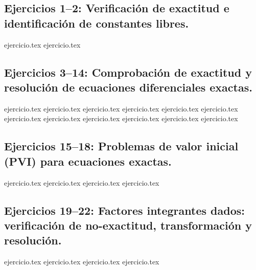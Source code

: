 
\subsection*{Ejercicios 1--2: Verificación de exactitud e identificación de constantes libres.}
\begin{enumerate}
    {ejercicio.tex}
    {ejercicio.tex}
\end{enumerate}

\subsection*{Ejercicios 3--14: Comprobación de exactitud y resolución de ecuaciones diferenciales exactas.}
\begin{enumerate}
    \setcounter{enumi}{2}
    {ejercicio.tex}
    {ejercicio.tex}
    {ejercicio.tex}
    {ejercicio.tex}
    {ejercicio.tex}
    {ejercicio.tex}
    {ejercicio.tex}
    {ejercicio.tex}
    {ejercicio.tex}
    {ejercicio.tex}
    {ejercicio.tex}
    {ejercicio.tex}
\end{enumerate}

\subsection*{Ejercicios 15--18: Problemas de valor inicial (PVI) para ecuaciones exactas.}
\begin{enumerate}
    \setcounter{enumi}{14}
    {ejercicio.tex}
    {ejercicio.tex}
    {ejercicio.tex}
    {ejercicio.tex}
\end{enumerate}

\subsection*{Ejercicios 19--22: Factores integrantes dados: verificación de no-exactitud, transformación y resolución.}
\begin{enumerate}
    \setcounter{enumi}{18}
    {ejercicio.tex}
    {ejercicio.tex}
    {ejercicio.tex}
    {ejercicio.tex}
\end{enumerate}

